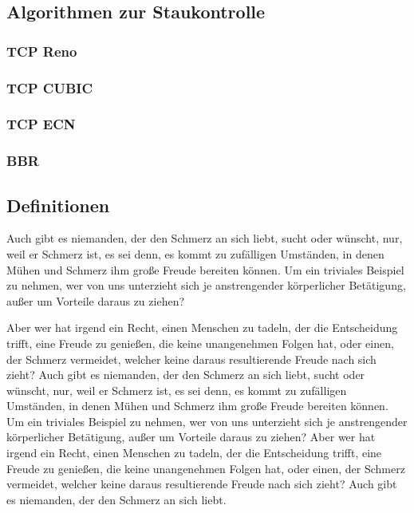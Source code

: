 \documentclass[paper=a4,fontsize=12pt,ngerman]{scrartcl}
\begin{document}
\subsection{Algorithmen zur Staukontrolle }
\subsubsection{TCP Reno}


\subsubsection{TCP CUBIC}

\subsubsection{TCP ECN}

\subsubsection{BBR} 


\subsection{Definitionen}
Auch gibt es niemanden, der den Schmerz an sich liebt, sucht oder wünscht, 
nur, weil er Schmerz ist, es sei denn, es kommt zu zufälligen Umständen, in 
denen Mühen und Schmerz ihm große Freude bereiten können. Um ein triviales 
Beispiel zu nehmen, wer von uns unterzieht sich je anstrengender körperlicher 
Betätigung, außer um Vorteile daraus zu ziehen?

Aber wer hat irgend ein Recht, einen Menschen zu tadeln, der die Entscheidung 
trifft, eine Freude zu genießen, die keine unangenehmen Folgen hat, oder 
einen, der Schmerz vermeidet, welcher keine daraus resultierende Freude nach 
sich zieht? Auch gibt es niemanden, der den Schmerz an sich liebt, sucht oder 
wünscht, nur, weil er Schmerz ist, es sei denn, es kommt zu zufälligen 
Umständen, in denen Mühen und Schmerz ihm große Freude bereiten können. Um 
ein triviales Beispiel zu nehmen, wer von uns unterzieht sich je 
anstrengender körperlicher Betätigung, außer um Vorteile daraus zu ziehen? 
Aber wer hat irgend ein Recht, einen Menschen zu tadeln, der die Entscheidung 
trifft, eine Freude zu genießen, die keine unangenehmen Folgen hat, oder 
einen, der Schmerz vermeidet, welcher keine daraus resultierende Freude nach 
sich zieht? Auch gibt es niemanden, der den Schmerz an sich liebt.
\end{document}
